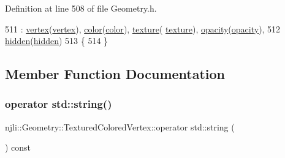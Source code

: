 Definition at line 508 of file Geometry.\+h.


\begin{DoxyCode}
511           : \mbox{\hyperlink{structnjli_1_1_geometry_1_1_textured_colored_vertex_ab49b5720f1cdbf1c63e62681db8f090f}{vertex}}(\mbox{\hyperlink{structnjli_1_1_geometry_1_1_textured_colored_vertex_ab49b5720f1cdbf1c63e62681db8f090f}{vertex}}), \mbox{\hyperlink{structnjli_1_1_geometry_1_1_textured_colored_vertex_a79e6bb9cb0daa0307eac09b828e4d993}{color}}(\mbox{\hyperlink{structnjli_1_1_geometry_1_1_textured_colored_vertex_a79e6bb9cb0daa0307eac09b828e4d993}{color}}), \mbox{\hyperlink{structnjli_1_1_geometry_1_1_textured_colored_vertex_a933ff52f4cd0a7768836e458f1a1218c}{texture}}(
      \mbox{\hyperlink{structnjli_1_1_geometry_1_1_textured_colored_vertex_a933ff52f4cd0a7768836e458f1a1218c}{texture}}), \mbox{\hyperlink{structnjli_1_1_geometry_1_1_textured_colored_vertex_a8c7d91ac68083909b5116f7d130c39ca}{opacity}}(\mbox{\hyperlink{structnjli_1_1_geometry_1_1_textured_colored_vertex_a8c7d91ac68083909b5116f7d130c39ca}{opacity}}),
512             \mbox{\hyperlink{structnjli_1_1_geometry_1_1_textured_colored_vertex_a506ec1fdd64c4b0530a33a53d075c3d2}{hidden}}(\mbox{\hyperlink{structnjli_1_1_geometry_1_1_textured_colored_vertex_a506ec1fdd64c4b0530a33a53d075c3d2}{hidden}})
513       \{
514       \}
\end{DoxyCode}


\subsection{Member Function Documentation}
\mbox{\label{structnjli_1_1_geometry_1_1_textured_colored_vertex_a15c9426d82becac2545bf4533c91d6c6}} 
\subsubsection{\texorpdfstring{operator std\+::string()}{operator std::string()}}
{\footnotesize\ttfamily njli\+::\+Geometry\+::\+Textured\+Colored\+Vertex\+::operator std\+::string (\begin{DoxyParamCaption}{ }\end{DoxyParamCaption}) const\hspace{0.3cm}{\ttfamily [inline]}}



